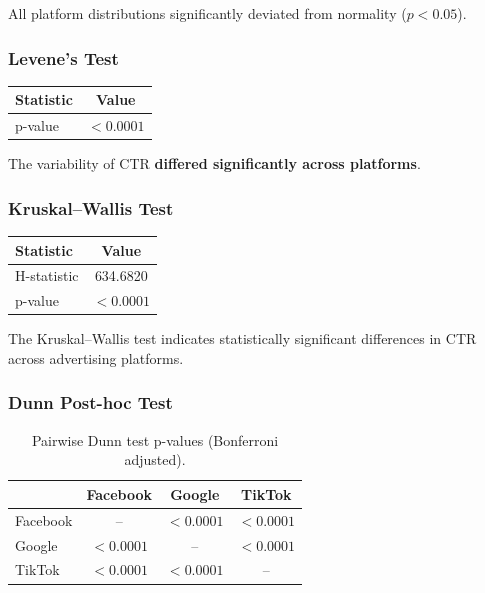 All platform distributions significantly deviated from normality ($p<0.05$).

\vspace{0.3cm}

\subsubsection{Levene's Test}

\begin{table}[H]
	\centering
	\begin{tabular}{lc}
		\toprule
		Statistic & Value \\
		\midrule
		p-value & $<0.0001$ \\
		\bottomrule
	\end{tabular}
\end{table}

The variability of CTR\textbf{ differed significantly across platforms}.

\vspace{0.3cm}

\subsubsection{Kruskal--Wallis Test}

\begin{table}[H]
	\centering
	\begin{tabular}{lc}
		\toprule
		Statistic & Value \\
		\midrule
		H-statistic & 634.6820 \\
		p-value & $<0.0001$ \\
		\bottomrule
	\end{tabular}
\end{table}

The Kruskal--Wallis test indicates statistically significant differences in CTR across advertising platforms.

\vspace{0.3cm}

\subsubsection{Dunn Post-hoc Test}

\begin{table}[H]
	\centering
	\caption{Pairwise Dunn test p-values (Bonferroni adjusted).}
	\begin{tabular}{lccc}
		\toprule
		& Facebook & Google & TikTok \\
		\midrule
		Facebook & -- & $<0.0001$ & $<0.0001$ \\
		Google & $<0.0001$ & -- & $<0.0001$ \\
		TikTok & $<0.0001$ & $<0.0001$ & -- \\
		\bottomrule
	\end{tabular}
\end{table}

